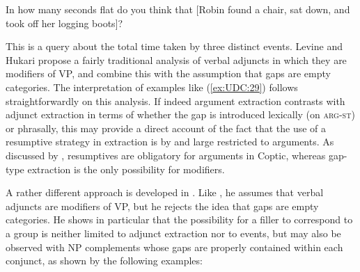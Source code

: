 \documentclass[output=paper
                ,modfonts
                ,nonflat
	        ,collection
	        ,collectionchapter
	        ,collectiontoclongg
 	        ,biblatex
                ,babelshorthands
                ,newtxmath
                ,draftmode
                ,colorlinks, citecolor=brown
]{./langsci/langscibook}
\begin{document}
{\begin{exe}
\ex \label{ex:UDC:29}
In how many seconds flat do you think that {[}Robin found a chair,
sat down, and took off her logging boots{]}?
\end{exe}

\noindent
This is a query about the total time taken by three distinct events.
Levine and Hukari propose a fairly traditional analysis of verbal
adjuncts in which they are modifiers of VP, and combine this with the
assumption that gaps are empty categories. The interpretation of
examples like (\ref{ex:UDC:29}) follows straightforwardly on this
analysis. If indeed argument extraction contrasts with adjunct
extraction in terms of whether the gap is introduced  lexically (on
\textsc{arg-st}) or phrasally, this may
provide a direct account of the fact that the use of a resumptive
strategy in extraction is by and large restricted to arguments. As
discussed by \citet{Crysmann:Reintges:14}, resumptives are obligatory
for arguments in Coptic, whereas gap-type extraction is the only
possibility for modifiers.
 

A rather different approach is developed in \citet{Chaves:09}. Like
\citet{Levine:Hukari:06}, he assumes that verbal adjuncts are
modifiers of VP, but he rejects the idea that gaps are empty
categories. He shows in particular that the possibility for a filler
to correspond to a group is neither limited to adjunct extraction nor
to events, but may also be observed with NP complements whose gaps are
properly contained within each conjunct, as shown by the following
examples:

\begin{exe} \ex \begin{xlist} \label{ex:UDC:31}


\end{xlist}
\end{exe}


}
\end{document}
